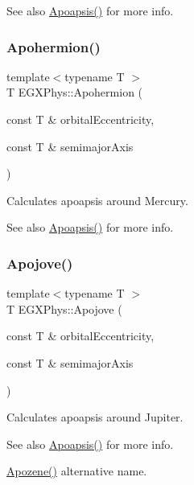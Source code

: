 \begin{DoxySeeAlso}{See also}
\mbox{\hyperlink{group___e_g_x_phys-_apoapsis_gaf962e650bf84a568458e8eb39b1c61ba}{Apoapsis()}} for more info. 
\end{DoxySeeAlso}
\mbox{\label{group___e_g_x_phys-_apoapsis_gab002349e578241b3514f2212da9a7d48}} 
\subsubsection{\texorpdfstring{Apohermion()}{Apohermion()}}
{\footnotesize\ttfamily template$<$typename T $>$ \\
T E\+G\+X\+Phys\+::\+Apohermion (\begin{DoxyParamCaption}\item[{const T \&}]{orbital\+Eccentricity,  }\item[{const T \&}]{semimajor\+Axis }\end{DoxyParamCaption})}



Calculates apoapsis around Mercury. 

\begin{DoxySeeAlso}{See also}
\mbox{\hyperlink{group___e_g_x_phys-_apoapsis_gaf962e650bf84a568458e8eb39b1c61ba}{Apoapsis()}} for more info. 
\end{DoxySeeAlso}
\mbox{\label{group___e_g_x_phys-_apoapsis_ga5a45d0a873514113aaa0adc95aefbbde}} 
\subsubsection{\texorpdfstring{Apojove()}{Apojove()}}
{\footnotesize\ttfamily template$<$typename T $>$ \\
T E\+G\+X\+Phys\+::\+Apojove (\begin{DoxyParamCaption}\item[{const T \&}]{orbital\+Eccentricity,  }\item[{const T \&}]{semimajor\+Axis }\end{DoxyParamCaption})}



Calculates apoapsis around Jupiter. 

\begin{DoxySeeAlso}{See also}
\mbox{\hyperlink{group___e_g_x_phys-_apoapsis_gaf962e650bf84a568458e8eb39b1c61ba}{Apoapsis()}} for more info. 

\mbox{\hyperlink{group___e_g_x_phys-_apoapsis_ga44d3dd8d8b350d053b25b7b1f1e15534}{Apozene()}} alternative name. 
\end{DoxySeeAlso}
\mbox{\label{group___e_g_x_phys-_apoapsis_ga98557a8d49aa129c29e652c4758334d1}} 
